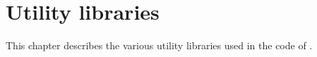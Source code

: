 
\newpage
\section*{Utility libraries}

\ocwsection \label{lib}
This chapter describes the various utility libraries used in the code
of \Coq.
